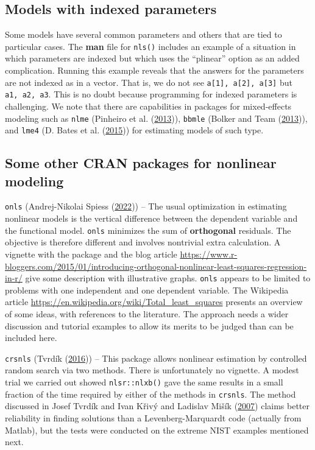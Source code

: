 \hypertarget{models-with-indexed-parameters}{%
\subsection{Models with indexed parameters}\label{models-with-indexed-parameters}}

Some models have several common parameters and
others that are tied to particular cases.
The \textbf{man} file for \texttt{nls()} includes an example of a situation in which
parameters are indexed but which uses the ``plinear'' option as an added complication.
Running this example reveals that the answers for the parameters are not indexed
as in a vector.
That is, we do not see \texttt{a{[}1{]},\ a{[}2{]},\ a{[}3{]}} but \texttt{a1,\ a2,\ a3}.
This is no doubt because programming for indexed parameters is challenging.
We note that there are capabilities in packages for mixed-effects modeling
such as \texttt{nlme} (Pinheiro et al. (\protect\hyperlink{ref-p-nlme}{2013})), \texttt{bbmle} (Bolker and Team (\protect\hyperlink{ref-p-bbmle}{2013})), and \texttt{lme4} (D. Bates et al. (\protect\hyperlink{ref-p-lme4}{2015})) for
estimating models of such type.

\hypertarget{some-other-cran-packages-for-nonlinear-modeling}{%
\subsection{Some other CRAN packages for nonlinear modeling}\label{some-other-cran-packages-for-nonlinear-modeling}}

\texttt{onls} (Andrej-Nikolai Spiess (\protect\hyperlink{ref-R-onls-manual}{2022})) -- The usual optimization in estimating nonlinear models
is the vertical difference between the dependent variable and the functional
model. \texttt{onls} minimizes the sum of \textbf{orthogonal} residuals. The objective is
therefore different and involves nontrivial extra calculation. A vignette with
the package and the blog article
\url{https://www.r-bloggers.com/2015/01/introducing-orthogonal-nonlinear-least-squares-regression-in-r/}
give some description with illustrative graphs. \texttt{onls} appears to be limited to
problems with one independent and one dependent variable. The Wikipedia article
\url{https://en.wikipedia.org/wiki/Total_least_squares} presents an overview of some
ideas, with references to the literature. The approach needs a wider
discussion and tutorial examples to allow its merits to be judged than can be
included here.

\texttt{crsnls} (Tvrdík (\protect\hyperlink{ref-R-crsnls-manual}{2016})) -- This package allows nonlinear estimation by
controlled random search via two methods. There is unfortunately no vignette.
A modest trial we carried out showed \texttt{nlsr::nlxb()} gave the same results in
a small fraction of the time required by either of the methods in \texttt{crsnls}. The
method discussed in Josef Tvrdík and Ivan Křivý and Ladislav Mišík (\protect\hyperlink{ref-tvrdik2007}{2007}) claims better reliability in finding solutions
than a Levenberg-Marquardt code (actually from Matlab), but the tests were conducted
on the extreme NIST examples mentioned next.

